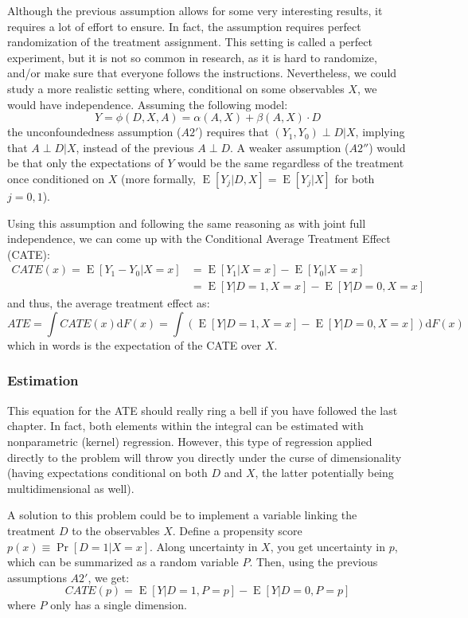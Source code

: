 \documentclass[12pt]{report}
\def\D{\mathrm{d}}
\newcommand{\E}[1]{\operatorname{E}\left[#1\right]}
\def\D{\mathrm{d}}
\newcommand{\Prob}[1]{\operatorname{Pr}\left[#1\right]}
\def\D{\mathrm{d}}
\begin{document}
Although the previous assumption allows for some very interesting results, it requires a lot of effort to ensure. In fact, the assumption requires perfect randomization of the treatment assignment. This setting is called a perfect experiment, but it is not so common in research, as it is hard to randomize, and/or make sure that everyone follows the instructions. Nevertheless, we could study a more realistic setting where, conditional on some observables $X$, we would have independence. Assuming the following model:
$$ Y = \phi(D, X, A) = \alpha(A, X) + \beta(A, X)\cdot D $$ the unconfoundedness assumption ($A2'$) requires that $(Y_1, Y_0) \perp D\vert X $, implying that $A\perp D\vert X$, instead of the previous $A\perp D$. A weaker assumption ($A2''$) would be that only the expectations of $Y$ would be the same regardless of the treatment once conditioned on $X$ (more formally, $\E{Y_j\vert D, X} = \E{Y_j\vert X}$ for both $j = 0,1$).

Using this assumption and following the same reasoning as with joint full independence, we can come up with the Conditional Average Treatment Effect (CATE): \begin{align*} CATE(x) = \E{Y_1 - Y_0\vert X=x} & = \E{Y_1 \vert X=x} - \E{Y_0\vert X=x} \\ & = \E{Y \vert D=1, X=x} - \E{Y\vert D=0, X=x}
\end{align*}
and thus, the average treatment effect as: $$ATE = \int CATE(x) \D F(x) = \int \left(\E{Y \vert D=1, X=x} - \E{Y\vert D=0, X=x}\right)\D F(x) $$ which in words is the expectation of the CATE over $X$.

\subsubsection{Estimation}

This equation for the ATE should really ring a bell if you have followed the last chapter. In fact, both elements within the integral can be estimated with nonparametric (kernel) regression. However, this type of regression applied directly to the problem will throw you directly under the curse of dimensionality (having expectations conditional on both $D$ and $X$, the latter potentially being multidimensional as well).

A solution to this problem could be to implement a variable linking the treatment $D$ to the observables $X$. Define a propensity score $p(x) \equiv \Prob{D = 1\vert X = x}$. Along uncertainty in $X$, you get uncertainty in $p$, which can be summarized as a random variable $P$. Then, using the previous assumptions $A2'$, we get: $$ CATE(p) = \E{Y \vert D=1, P=p} - \E{Y\vert D=0, P=p} $$ where $P$ only has a single dimension.
\end{document}
